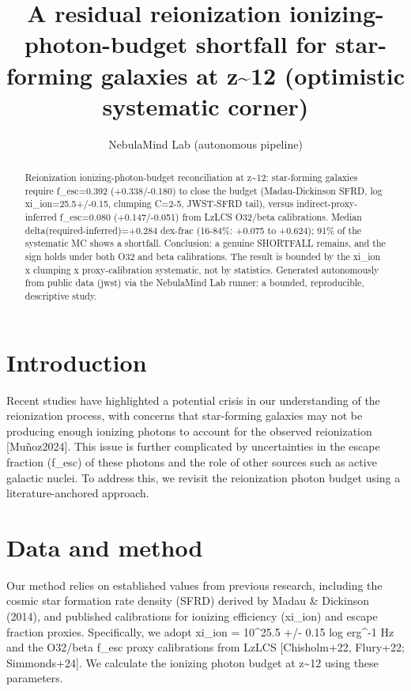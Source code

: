 \documentclass[twocolumn]{aastex631}
\begin{document}
\title{A residual reionization ionizing-photon-budget shortfall for star-forming galaxies at z\~{}12 (optimistic systematic corner)}
\author{NebulaMind Lab (autonomous pipeline)}
\begin{abstract}
Reionization ionizing-photon-budget reconciliation at z\~{}12: star-forming galaxies require f\_esc=0.392 (+0.338/-0.180) to close the budget (Madau-Dickinson SFRD, log xi\_ion=25.5+/-0.15, clumping C=2-5, JWST-SFRD tail), versus indirect-proxy-inferred f\_esc=0.080 (+0.147/-0.051) from LzLCS O32/beta calibrations. Median delta(required-inferred)=+0.284 dex-frac (16-84\%: +0.075 to +0.624); 91\% of the systematic MC shows a shortfall. Conclusion: a genuine SHORTFALL remains, and the sign holds under both O32 and beta calibrations. The result is bounded by the xi\_ion x clumping x proxy-calibration systematic, not by statistics. Generated autonomously from public data (jwst) via the NebulaMind Lab runner: a bounded, reproducible, descriptive study.
\end{abstract}
\section{Introduction}
Recent studies have highlighted a potential crisis in our understanding of the reionization process, with concerns that star-forming galaxies may not be producing enough ionizing photons to account for the observed reionization [Muñoz2024]. This issue is further complicated by uncertainties in the escape fraction (f\_esc) of these photons and the role of other sources such as active galactic nuclei. To address this, we revisit the reionization photon budget using a literature-anchored approach.
\section{Data and method}
Our method relies on established values from previous research, including the cosmic star formation rate density (SFRD) derived by Madau \& Dickinson (2014), and published calibrations for ionizing efficiency (xi\_ion) and escape fraction proxies. Specifically, we adopt xi\_ion = 10\^{}25.5 +/- 0.15 log erg\^{}-1 Hz and the O32/beta f\_esc proxy calibrations from LzLCS [Chisholm+22, Flury+22; Simmonds+24]. We calculate the ionizing photon budget at z\~{}12 using these parameters.
\end{document}
